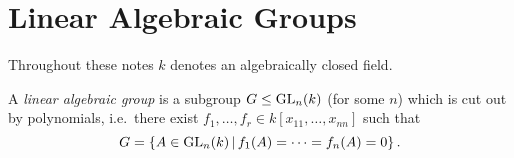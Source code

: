 \section{Linear Algebraic Groups}


\begin{conventions}
  Throughout these notes $k$ denotes an algebraically closed field.
\end{conventions}


\begin{definition}
  A \emph{linear algebraic group} is a subgroup $G \leq \operatorname{GL}_n(k)$ (for some $n$) which is cut out by polynomials, i.e.\ there exist $f_1, \dotsc, f_r \in k[x_{11}, \dotsc, x_{nn}]$ such that
  \[
      G
    = \{
        A \in \GL_n(k)
      \suchthat
        f_1(A) = \dotsb = f_n(A) = 0
      \} \,.
  \]
\end{definition}


